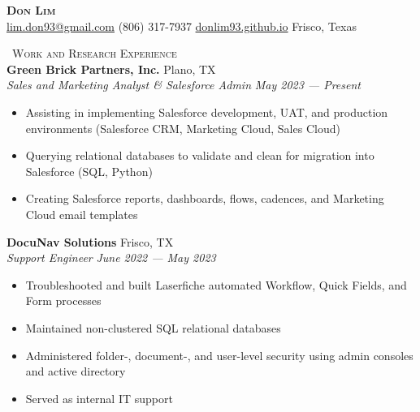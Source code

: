 \documentclass[a4paper,11pt]{article}
\newcommand{\header} [1] {
    \vspace{1mm}
    {\textsc{\large{\xrfill[0.5ex]{0.5pt}~#1~\xrfill[0.5ex]{0.5pt}}}} %
}
\begin{document}
\vspace*{-45pt}
\fontsize{11}{11.5}\selectfont


\vspace*{1mm}
\begin{center}
    {\Huge\textbf\textsc{{{Don Lim}}}}\\ \vspace{1mm}
    \href{mailto:lim.don93@gmail.com}{\Letter\space lim.don93@gmail.com}  \Mobilefone\space (806) 317-7937  \href{https://donlim93.github.io/}{\faGlobe\space donlim93.github.io}  \faMapMarker\space Frisco, Texas \\
\end{center}
\vspace*{-2mm}

\header{Work and Research Experience} \\
\vspace{1mm}
\textbf{Green Brick Partners, Inc.} \hfill Plano, TX \\
\textit{Sales and Marketing Analyst \& Salesforce Admin} \hfill  \emph{May 2023 --- Present} \\
\begin{itemize}
    \item Assisting in implementing Salesforce development, UAT, and production environments (Salesforce CRM, Marketing Cloud, Sales Cloud) 
    \item Querying relational databases to validate and clean for migration into Salesforce (SQL, Python)
    \item Creating Salesforce reports, dashboards, flows, cadences, and Marketing Cloud email templates
\end{itemize}
\vspace{1mm}

\textbf{DocuNav Solutions} \hfill Frisco, TX \\
\textit{Support Engineer} \hfill  \emph{June 2022 --- May 2023} \\
\begin{itemize}
    \item Troubleshooted and built Laserfiche automated Workflow, Quick Fields, and Form processes
    \item Maintained non-clustered SQL relational databases
    \item Administered folder-, document-, and user-level security using admin consoles and active directory
    \item Served as internal IT support
\end{itemize}    
\vspace{1mm}
\end{document}
